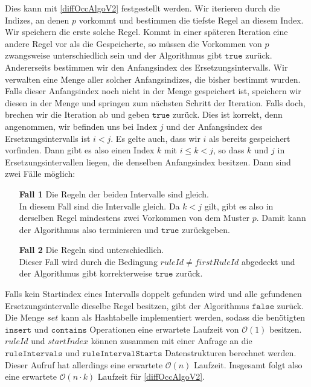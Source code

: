 Dies kann mit \autoref{diffOccAlgoV2} festgestellt werden.
Wir iterieren durch die Indizes, an denen $p$ vorkommt und bestimmen die tiefste Regel an diesem Index. Wir speichern die erste solche Regel. Kommt in einer späteren Iteration eine andere Regel vor als die Gespeicherte, so müssen die Vorkommen von $p$ zwangsweise unterschiedlich sein und der Algorithmus gibt $\texttt{true}$ zurück.
Andererseits bestimmen wir den Anfangsindex des Ersetzungsintervalls. Wir verwalten eine Menge aller solcher Anfangsindizes, die bisher bestimmt wurden. 
Falls dieser Anfangsindex noch nicht in der Menge gespeichert ist, speichern wir diesen in der Menge und springen zum nächsten Schritt der Iteration. Falls doch, brechen wir die Iteration ab und geben $\texttt{true}$ zurück. 
Dies ist korrekt, denn angenommen, wir befinden uns bei Index $j$ und der Anfangsindex des Ersetzungsintervalls ist $i < j$. Es gelte auch, dass wir $i$ als bereits gespeichert vorfinden. Dann gibt es also einen Index $k$ mit $i \leq k < j$, so dass $k$ und $j$ in Ersetzungsintervallen liegen, die denselben Anfangsindex besitzen. Dann sind zwei Fälle möglich:

\begin{enumerate}
	\item[\textbf{Fall 1}] Die Regeln der beiden Intervalle sind gleich.\\
	In diesem Fall sind die Intervalle gleich. Da $k < j$ gilt, gibt es also in derselben Regel mindestens zwei Vorkommen von dem Muster $p$. Damit kann der Algorithmus also terminieren und $\texttt{true}$ zurückgeben.
	\item[\textbf{Fall 2}] Die Regeln sind unterschiedlich.\\
	Dieser Fall wird durch die Bedingung $ruleId \neq firstRuleId$ abgedeckt und der Algorithmus gibt korrekterweise $\texttt{true}$ zurück.
\end{enumerate}

Falls kein Startindex eines Intervalls doppelt gefunden wird und alle gefundenen Ersetzungsintervalle dieselbe Regel besitzen, gibt der Algorithmus $\texttt{false}$ zurück.
Die Menge $set$ kann als Hashtabelle implementiert werden, sodass die benötigten $\texttt{insert}$ und $\texttt{contains}$ Operationen eine erwartete Laufzeit von $\mathcal{O}(1)$ besitzen. $ruleId$ und $startIndex$ können zusammen mit einer Anfrage an die $\texttt{ruleIntervals}$ und $\texttt{ruleIntervalStarts}$ Datenstrukturen berechnet werden. Dieser Aufruf hat allerdings eine erwartete $\mathcal{O}(n)$ Laufzeit. Insgesamt folgt also eine erwartete $\mathcal{O}(n \cdot k)$ Laufzeit für \autoref{diffOccAlgoV2}.

